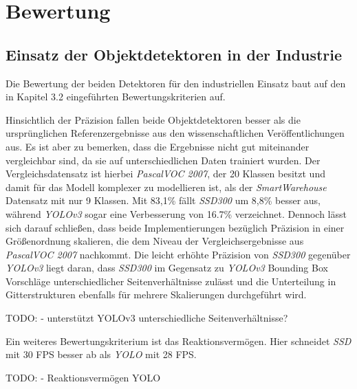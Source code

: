\chapter{Bewertung}

\section{Einsatz der Objektdetektoren in der Industrie}

Die Bewertung der beiden Detektoren für den industriellen Einsatz baut auf den in Kapitel 3.2 eingeführten Bewertungskriterien auf. 

Hinsichtlich der Präzision fallen beide Objektdetektoren besser als die ursprünglichen Referenzergebnisse aus den wissenschaftlichen Veröffentlichungen aus. Es ist aber zu bemerken, dass die Ergebnisse nicht gut miteinander vergleichbar sind, da sie auf unterschiedlichen Daten trainiert wurden. Der Vergleichsdatensatz ist hierbei \textit{PascalVOC 2007}, der 20 Klassen besitzt und damit für das Modell komplexer zu modellieren ist, als der \textit{SmartWarehouse} Datensatz mit nur 9 Klassen. Mit 83,1\% fällt \textit{SSD300} um 8,8\% besser aus, während \textit{YOLOv3} sogar eine Verbesserung von 16.7\% verzeichnet. Dennoch lässt sich darauf schließen, dass beide Implementierungen bezüglich Präzision in einer Größenordnung skalieren, die dem Niveau der Vergleichsergebnisse aus \textit{PascalVOC 2007} nachkommt. Die leicht erhöhte Präzision von \textit{SSD300} gegenüber \textit{YOLOv3} liegt daran, dass \textit{SSD300} im Gegensatz zu \textit{YOLOv3} Bounding Box Vorschläge unterschiedlicher Seitenverhältnisse zulässt und die Unterteilung in Gitterstrukturen ebenfalls für mehrere Skalierungen durchgeführt wird.

TODO:
- unterstützt YOLOv3 unterschiedliche Seitenverhältnisse?

Ein weiteres Bewertungskriterium ist das Reaktionsvermögen. Hier schneidet \textit{SSD} mit 30 FPS besser ab als \textit{YOLO} mit 28 FPS. 

TODO:
- Reaktionsvermögen YOLO

